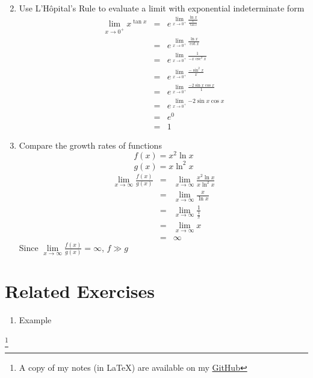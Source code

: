 \documentclass{article}
\newcommand\blfootnote[1]{
    \begingroup
    \renewcommand\thefootnote{}\footnote{#1}
    \addtocounter{footnote}{-1}
    \endgroup
}
\begin{document}
\begin{enumerate}
\begin{eqnarray}
        \end{eqnarray}
    \item Use L'Hôpital's Rule to evaluate a limit with exponential indeterminate form
        \begin{eqnarray}
            \lim_{x \to 0^+}{x^{\tan{x}}} &=& e^{\lim\limits_{x \to 0^+}{\frac{\ln{x}}{\frac{1}{\tan{x}}}}} \\
                                          &=& e^{\lim\limits_{x \to 0^+}{\frac{\ln{x}}{\cot{x}}}} \\
                                          &=& e^{\lim\limits_{x \to 0^+}{\frac{1}{-x\csc^2{x}}}} \\
                                          &=& e^{\lim\limits_{x \to 0^+}{\frac{-\sin^2{x}}{x}}} \\
                                          &=& e^{\lim\limits_{x \to 0^+}{\frac{-2\sin{x}\cos{x}}{1}}} \\
                                          &=& e^{\lim\limits_{x \to 0^+}{-2\sin{x}\cos{x}}} \\
                                          &=& e^0 \\
                                          &=& 1
        \end{eqnarray}
    \item Compare the growth rates of functions
        $$f(x) = x^2\ln{x}$$
        $$g(x) = x\ln^2{x}$$
        \begin{eqnarray}
            \lim_{x \to \infty}{\frac{f(x)}{g(x)}} &=& \lim_{x \to \infty}{\frac{x^2\ln{x}}{x\ln^2{x}}} \\
                                                   &=& \lim_{x \to \infty}{\frac{x}{\ln{x}}} \\
                                                   &=& \lim_{x \to \infty}{\frac{1}{\frac{1}{x}}} \\
                                                   &=& \lim_{x \to \infty}{x} \\
                                                   &=& \infty
        \end{eqnarray}
        Since $\lim\limits_{x \to \infty}{\frac{f(x)}{g(x)}} = \infty$, $f \gg g$
\end{enumerate}

\section*{Related Exercises}
\begin{enumerate}
    \item Example
\end{enumerate}

\blfootnote{A copy of my notes (in \LaTeX) are available on my \href{https://github.com/onlinechronically/MATH-211}{GitHub}}
\end{document}
